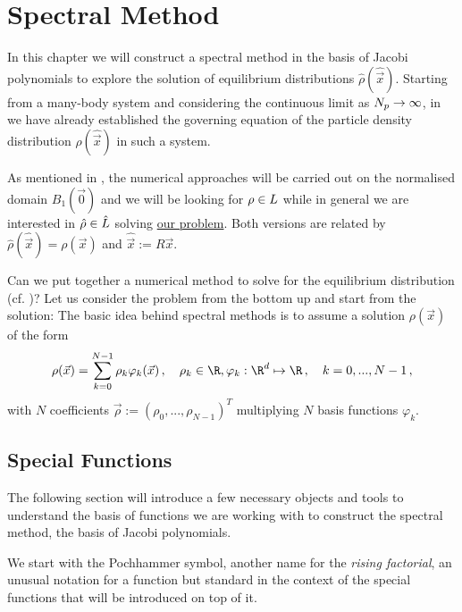 \chapter{Spectral Method}
\label{chap:spectral-method}

% 

In this chapter we will construct a spectral method in the basis of Jacobi polynomials to explore the solution of equilibrium distributions $\hat{\rho}(\hat{\vec{x}})$.
Starting from a many-body system and considering the continuous limit as $N_p \rightarrow \infty$, in  we have already established the governing equation of the particle density distribution $\hat{\rho}(\hat{\vec{x}})$ in such a system.

As mentioned in , the numerical approaches will be carried out on the normalised domain $B_1(\vec{0})$ and we will be looking for $\rho \in L$ while in general we are interested in $\hat{\rho} \in \hat{L}$ solving \href{def:the-problem}{our problem}.
Both versions are related by $\hat{\rho}(\hat{\vec{x}}) = \rho(\vec{x})$ and $\hat{\vec{x}} := R \vec{x}$.

Can we put together a numerical method to solve for the equilibrium distribution (cf. )?
Let us consider the problem from the bottom up and start from the solution:
The basic idea behind spectral methods is to assume a solution $\rho(\vec{x})$ of the form
$$\rho(\vec{x}) = \sum_{k=0}^{N-1} \rho_k \varphi_k(\vec{x})\,,\quad \rho_k \in \R, \varphi_k: \R^d \mapsto \R\,,\quad k = 0, ..., N-1\,,$$
with $N$ coefficients $\vec{\rho} := \left(\rho_0, ..., \rho_{N-1}\right)^T$ multiplying $N$ basis functions $\varphi_k$.

\pagebreak
\section{Special Functions}
The following section will introduce a few necessary objects and tools to understand the basis of functions we are working with to construct the spectral method, the basis of Jacobi polynomials.

We start with the Pochhammer symbol, another name for the \textit{rising factorial}, an unusual notation for a function but standard in the context of the special functions that will be introduced on top of it.


